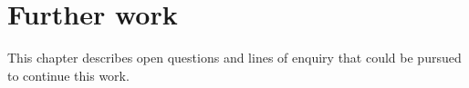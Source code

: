 
\chapter{Further work}

This chapter describes open questions and lines of enquiry that could
be pursued to continue this work.


